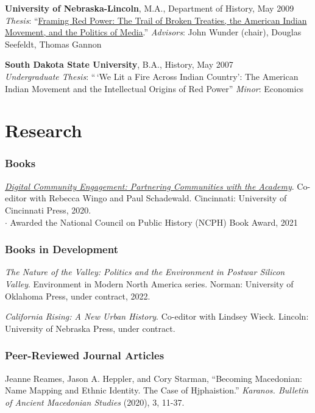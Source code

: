 \textbf{University of Nebraska-Lincoln}, M.A., Department of History,
May 2009\\
\emph{Thesis}:
``\href{http://digitalcommons.unl.edu/historydiss/21/}{Framing Red
Power: The Trail of Broken Treaties, the American Indian Movement, and
the Politics of Media}.'' \emph{Advisors}: John Wunder (chair), Douglas
Seefeldt, Thomas Gannon

\textbf{South Dakota State University}, B.A., History, May 2007\\
\emph{Undergraduate Thesis}: ``\,`We Lit a Fire Across Indian Country':
The American Indian Movement and the Intellectual Origins of Red Power''
\emph{Minor}: Economics

\section{Research}\label{research}

\subsubsection{Books}\label{books}

\emph{\href{https://ucincinnatipress.manifoldapp.org/projects/digital-community-engagement}{Digital
Community Engagement: Partnering Communities with the Academy}}.
Co-editor with Rebecca Wingo and Paul Schadewald. Cincinnati: University
of Cincinnati Press, 2020.\\
\quad \(\cdot\) Awarded the National Council on Public History (NCPH)
Book Award, 2021

\subsubsection{Books in Development}\label{books-in-development}

\emph{The Nature of the Valley: Politics and the Environment in Postwar
Silicon Valley}. Environment in Modern North America series. Norman:
University of Oklahoma Press, under contract, 2022.

\emph{California Rising: A New Urban History}. Co-editor with Lindsey
Wieck. Lincoln: University of Nebraska Press, under contract.

\subsubsection{Peer-Reviewed Journal
Articles}\label{peer-reviewed-journal-articles}

Jeanne Reames, Jason A. Heppler, and Cory Starman, ``Becoming
Macedonian: Name Mapping and Ethnic Identity. The Case of Hjphaistion.''
\emph{Karanos. Bulletin of Ancient Macedonian Studies} (2020), 3, 11-37.

